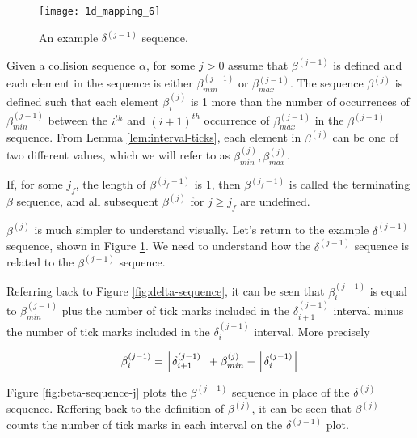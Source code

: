 \begin{figure}[H]
  \begin{center}
    \texttt{[image: 1d\_mapping\_6]}
  \end{center}
  \vspace{-.2in} %
  \caption{\label{fig:delta-sequence-2} An example $\delta^{(j-1)}$ sequence.}
\end{figure}

\begin{definition}
  \label{def:beta-definition}
  Given a collision sequence $\alpha$, for some $j > 0$ assume that $\beta^{(j-1)}$ is defined and each element in the sequence is either $\beta^{(j-1)}_{min}$ or $\beta^{(j-1)}_{max}$. The sequence $\beta^{(j)}$ is defined such that each element $\beta^{(j)}_i$ is 1 more than the number of occurrences of $\beta^{(j-1)}_{min}$ between the $i^{th}$ and $(i+1)^{th}$ occurrence of $\beta^{(j-1)}_{max}$ in the $\beta^{(j-1)}$ sequence. From Lemma \ref{lem:interval-ticks}, each element in $\beta^{(j)}$ can be one of two different values, which we will refer to as $\beta^{(j)}_{min}, \beta^{(j)}_{max}$.

  If, for some $j_f$, the length of $\beta^{(j_f-1)}$ is 1, then $\beta^{(j_f-1)}$ is called the terminating $\beta$ sequence, and all subsequent $\beta^{(j)}$ for $j \ge j_f$ are undefined.
\end{definition}

$\beta^{(j)}$ is much simpler to understand visually. Let's return to the example $\delta^{(j-1)}$ sequence, shown in Figure \ref{fig:delta-sequence-2}. We need to understand how the $\delta^{(j-1)}$ sequence is related to the $\beta^{(j-1)}$ sequence. 

Referring back to Figure \ref{fig:delta-sequence}, it can be seen that $\beta^{(j-1)}_i$ is equal to $\beta^{(j-1)}_{min}$ plus the number of tick marks included in the $\delta^{(j-1)}_{i+1}$ interval minus the number of tick marks included in the $\delta^{(j-1)}_i$ interval. More precisely

\begin{align}\label{eq:beta_i}
  \beta^{(j-1)}_i = \floor{\delta^{(j-1)}_{i+1}} + \beta^{(j)}_{min} - \floor{\delta^{(j-1)}_i} 
\end{align}

Figure \ref{fig:beta-sequence-j} plots the $\beta^{(j-1)}$ sequence in place of the $\delta^{(j)}$ sequence. Reffering back to the definition of $\beta^{(j)}$, it can be seen that $\beta^{(j)}$ counts the number of tick marks in each interval on the $\delta^{(j-1)}$ plot.

